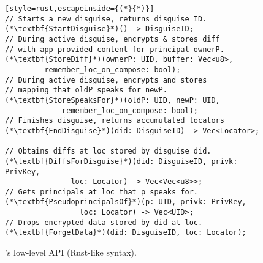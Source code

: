 \begin{figure}[t]
\begin{lstlisting}[style=rust,escapeinside={(*}{*)}]
// Starts a new disguise, returns disguise ID.
(*\textbf{StartDisguise}*)() -> DisguiseID;
// During active disguise, encrypts & stores diff
// with app-provided content for principal ownerP.
(*\textbf{StoreDiff}*)(ownerP: UID, buffer: Vec<u8>,
         remember_loc_on_compose: bool);
// During active disguise, encrypts and stores
// mapping that oldP speaks for newP.
(*\textbf{StoreSpeaksFor}*)(oldP: UID, newP: UID,
             remember_loc_on_compose: bool);
// Finishes disguise, returns accumulated locators
(*\textbf{EndDisguise}*)(did: DisguiseID) -> Vec<Locator>;

// Obtains diffs at loc stored by disguise did.
(*\textbf{DiffsForDisguise}*)(did: DisguiseID, privk: PrivKey,
               loc: Locator) -> Vec<Vec<u8>>;
// Gets principals at loc that p speaks for.
(*\textbf{PseudoprincipalsOf}*)(p: UID, privk: PrivKey,
                 loc: Locator) -> Vec<UID>;
// Drops encrypted data stored by did at loc.
(*\textbf{ForgetData}*)(did: DisguiseID, loc: Locator);
\end{lstlisting}
\caption{\sys's low-level API (Rust-like syntax).}
\label{f:api-low}
\end{figure}


